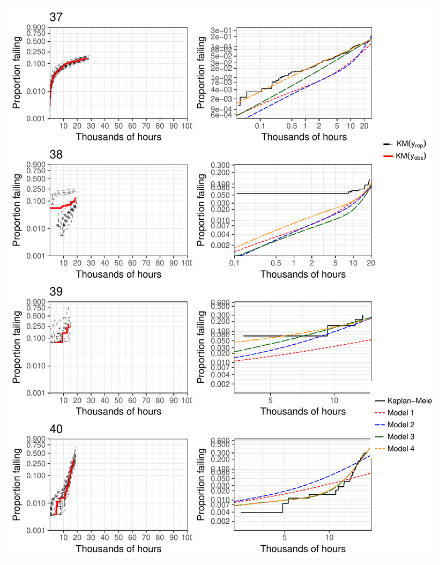 \documentclass[12pt]{article}
\begin{document}
\begin{figure}[H]
\includegraphics[width=\textwidth]{ppcheck-v2-10.pdf}
\end{figure}
\end{document}
